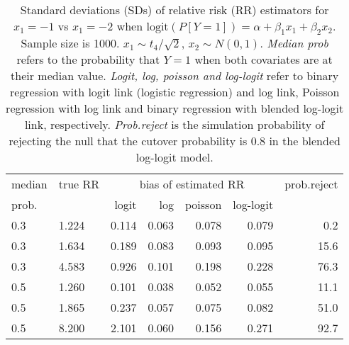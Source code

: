 \documentclass[12pt,a4paper]{article}
\begin{document}
\begin{table}[H] 
\small\sf\centering 
\caption{Standard deviations (SDs) of relative risk (RR) estimators for $x_1=-1$ vs $x_1=-2$ when $\mbox{logit}(P[Y=1])=\alpha+\beta_1 x_1 + \beta_2 x_2$. Sample size is 1000. $x_1 \sim $$t_4/\sqrt{2}$, $x_2 \sim N(0,1)$. {\it Median prob} refers to the probability that $Y=1$ when both covariates are at their median value. {\it Logit, log, poisson and log-logit} refer to binary regression with logit link (logistic regression) and log link, Poisson regression with log link and binary regression with blended log-logit link, respectively. {\it Prob.reject} is the simulation probability of rejecting the null that the cutover probability is $0.8$ in the blended log-logit model.} 
\begin{tabular}{llrrrrr} 
\toprule 
median & true RR & \multicolumn{4}{c}{bias of estimated RR} & prob.reject \\ 
prob. & & logit & log & poisson & log-logit  & \\ \midrule 
0.3 & 1.224 & 0.114 & 0.063 & 0.078 & 0.079 &  0.2 \\  
0.3 & 1.634 & 0.189 & 0.083 & 0.093 & 0.095 & 15.6 \\  
0.3 & 4.583 & 0.926 & 0.101 & 0.198 & 0.228 & 76.3 \\  
0.5 & 1.260 & 0.101 & 0.038 & 0.052 & 0.055 & 11.1 \\  
0.5 & 1.865 & 0.237 & 0.057 & 0.075 & 0.082 & 51.0 \\  
0.5 & 8.200 & 2.101 & 0.060 & 0.156 & 0.271 & 92.7 \\  
\bottomrule 
\end{tabular} 
\end{table} 
\end{document}
